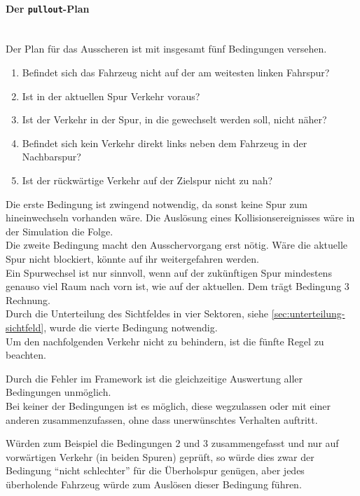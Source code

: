 \paragraph*{Der \texttt{pullout}-Plan}
\hfill \\
Der Plan für das Ausscheren ist mit insgesamt fünf Bedingungen versehen.

\begin{enumerate}
	\itemsep0em
	\item Befindet sich das Fahrzeug nicht auf der am weitesten linken Fahrspur?
	\item Ist in der aktuellen Spur Verkehr voraus?
	\item Ist der Verkehr in der Spur, in die gewechselt werden soll, nicht näher?
	\item Befindet sich kein Verkehr direkt links neben dem Fahrzeug in der Nachbarspur?
	\item Ist der rückwärtige Verkehr auf der Zielspur nicht zu nah?
\end{enumerate}

Die erste Bedingung ist zwingend notwendig, da sonst keine Spur zum hineinwechseln vorhanden wäre.
Die Auslösung eines Kollisionsereignisses wäre in der Simulation die Folge.
\\
Die zweite Bedingung macht den Ausschervorgang erst nötig. 
Wäre die aktuelle Spur nicht blockiert, könnte auf ihr weitergefahren werden.
\\
Ein Spurwechsel ist nur sinnvoll, wenn auf der zukünftigen Spur mindestens genauso viel Raum nach vorn ist, wie auf der aktuellen. 
Dem trägt Bedingung 3 Rechnung.
\\
Durch die Unterteilung des Sichtfeldes in vier Sektoren, siehe \cref{sec:unterteilung-sichtfeld}, wurde die vierte Bedingung notwendig.
\\
Um den nachfolgenden Verkehr nicht zu behindern, ist die fünfte Regel zu beachten.

Durch die Fehler im Framework ist die gleichzeitige Auswertung aller Bedingungen unmöglich.
\\
Bei keiner der Bedingungen ist es möglich, diese wegzulassen oder mit einer anderen zusammenzufassen, ohne dass unerwünschtes Verhalten auftritt.

Würden zum Beispiel die Bedingungen 2 und 3 zusammengefasst und nur auf vorwärtigen Verkehr (in beiden Spuren) geprüft, so würde dies zwar der Bedingung \enquote{nicht schlechter} für die Überholspur genügen, aber jedes überholende Fahrzeug würde zum Auslösen dieser Bedingung führen.

